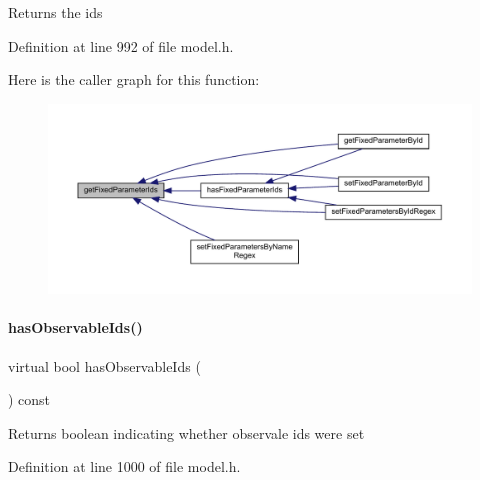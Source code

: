 \begin{DoxyReturn}{Returns}
the ids 
\end{DoxyReturn}


Definition at line 992 of file model.\+h.

Here is the caller graph for this function\+:
\nopagebreak
\begin{figure}[H]
\begin{center}
\leavevmode
\includegraphics[width=350pt]{classamici_1_1_model_a802aef820cb7ddabfb6330abba320bcf_icgraph}
\end{center}
\end{figure}
\mbox{\label{classamici_1_1_model_adb0d2d3b3aa9cd648efa3cf408d9abab}} 
\paragraph{\texorpdfstring{has\+Observable\+Ids()}{hasObservableIds()}}
{\footnotesize\ttfamily virtual bool has\+Observable\+Ids (\begin{DoxyParamCaption}{ }\end{DoxyParamCaption}) const\hspace{0.3cm}{\ttfamily [virtual]}}

\begin{DoxyReturn}{Returns}
boolean indicating whether observale ids were set 
\end{DoxyReturn}


Definition at line 1000 of file model.\+h.

